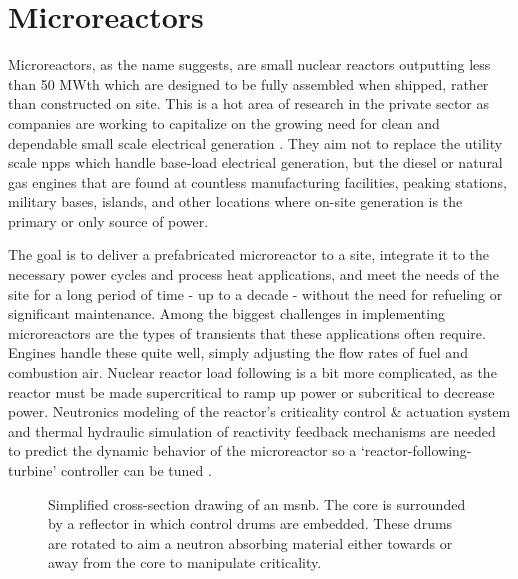 \section{Microreactors}
Microreactors, as the name suggests, are small nuclear reactors outputting less than 50 MWth which are designed to be fully assembled when shipped, rather than constructed on site. This is a hot area of research in the private sector as companies are working to capitalize on the growing need for clean and dependable small scale electrical generation \cite{PetersonMS}. They aim not to replace the utility scale \acfp{npp} which handle base-load electrical generation, but the diesel or natural gas engines that are found at countless manufacturing facilities, peaking stations, military bases, islands, and other locations where on-site generation is the primary or only source of power. 

The goal is to deliver a prefabricated microreactor to a site, integrate it to the necessary power cycles and process heat applications, and meet the needs of the site for a long period of time - up to a decade - without the need for refueling or significant maintenance. Among the biggest challenges in implementing microreactors are the types of transients that these applications often require. Engines handle these quite well, simply adjusting the flow rates of fuel and combustion air. Nuclear reactor load following is a bit more complicated, as the reactor must be made supercritical to ramp up power or subcritical to decrease power. Neutronics modeling of the reactor's criticality control \& actuation system and thermal hydraulic simulation of reactivity feedback mechanisms are needed to predict the dynamic behavior of the microreactor so a  `reactor-following-turbine' controller can be tuned \cite[Ch. 8]{Kerlin}.

\begin{figure}[!ht]
    \centering
    
    \caption[Simplified cross-section drawing of an \acs{msnb}]{Simplified cross-section drawing of an \acs{msnb}. The core is surrounded by a reflector in which control drums are embedded. These drums are rotated to aim a neutron absorbing material either towards or away from the core to manipulate criticality.}
    \label{fig:tikz_drum}
\end{figure}

